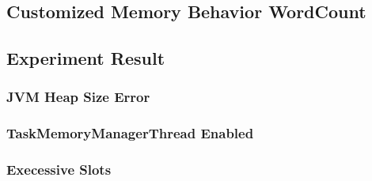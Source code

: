 \subsection{Customized Memory Behavior WordCount}


\subsection{Experiment Result}

\subsubsection{JVM Heap Size Error}


\subsubsection{TaskMemoryManagerThread Enabled}


\subsubsection{Execessive Slots}
